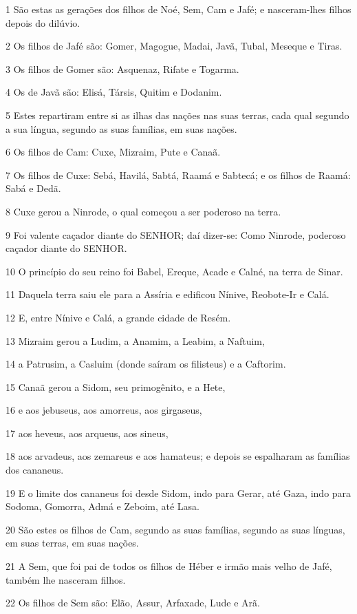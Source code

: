 \par 1 São estas as gerações dos filhos de Noé, Sem, Cam e Jafé; e nasceram-lhes filhos depois do dilúvio.
\par 2 Os filhos de Jafé são: Gomer, Magogue, Madai, Javã, Tubal, Meseque e Tiras.
\par 3 Os filhos de Gomer são: Asquenaz, Rifate e Togarma.
\par 4 Os de Javã são: Elisá, Társis, Quitim e Dodanim.
\par 5 Estes repartiram entre si as ilhas das nações nas suas terras, cada qual segundo a sua língua, segundo as suas famílias, em suas nações.
\par 6 Os filhos de Cam: Cuxe, Mizraim, Pute e Canaã.
\par 7 Os filhos de Cuxe: Sebá, Havilá, Sabtá, Raamá e Sabtecá; e os filhos de Raamá: Sabá e Dedã.
\par 8 Cuxe gerou a Ninrode, o qual começou a ser poderoso na terra.
\par 9 Foi valente caçador diante do SENHOR; daí dizer-se: Como Ninrode, poderoso caçador diante do SENHOR.
\par 10 O princípio do seu reino foi Babel, Ereque, Acade e Calné, na terra de Sinar.
\par 11 Daquela terra saiu ele para a Assíria e edificou Nínive, Reobote-Ir e Calá.
\par 12 E, entre Nínive e Calá, a grande cidade de Resém.
\par 13 Mizraim gerou a Ludim, a Anamim, a Leabim, a Naftuim,
\par 14 a Patrusim, a Casluim (donde saíram os filisteus) e a Caftorim.
\par 15 Canaã gerou a Sidom, seu primogênito, e a Hete,
\par 16 e aos jebuseus, aos amorreus, aos girgaseus,
\par 17 aos heveus, aos arqueus, aos sineus,
\par 18 aos arvadeus, aos zemareus e aos hamateus; e depois se espalharam as famílias dos cananeus.
\par 19 E o limite dos cananeus foi desde Sidom, indo para Gerar, até Gaza, indo para Sodoma, Gomorra, Admá e Zeboim, até Lasa.
\par 20 São estes os filhos de Cam, segundo as suas famílias, segundo as suas línguas, em suas terras, em suas nações.
\par 21 A Sem, que foi pai de todos os filhos de Héber e irmão mais velho de Jafé, também lhe nasceram filhos.
\par 22 Os filhos de Sem são: Elão, Assur, Arfaxade, Lude e Arã.
